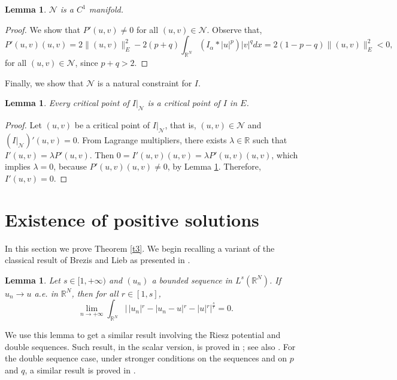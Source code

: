 \documentclass[12pt,a4paper]{article}
\newtheorem{lemma}[theorem]{Lemma}
\numberwithin{equation}{section}
\begin{document}
\begin{lemma}\label{l9}
$\mathcal{N}$ is a $C^1$ manifold.
\end{lemma}
\begin{proof}
We show that $P'(u, v)\neq 0$ for all $(u, v)\in \mathcal{N}$. Observe that,
$$
P'(u,v)(u, v)= 2\|(u, v)\|_{E}^{2}-2(p+q)\int_{\mathbb{R}^N} (I_\alpha \ast |u|^p)|v|^q dx = 2(1-p-q)\|(u, v)\|_{E}^{2} <0, 
$$
for all $(u, v)\in \mathcal{N}$, since $p+q>2$.
\end{proof}

Finally, we show that $\mathcal{N}$ is a natural constraint for $I$.

\begin{lemma}\label{l10}
Every critical point of $I\big\vert_{\mathcal{N}}$ is a critical point of $I$ in $E$.
\end{lemma}
\begin{proof}
Let $(u, v)$ be a critical point of $I\big\vert_{\mathcal{N}}$, that is, $(u, v)\in \mathcal{N}$ and $(I\big\vert_{\mathcal{N}})'(u, v)=0$. From Lagrange multipliers, there exists $\lambda\in \mathbb{R}$ such that
$
I'(u, v)= \lambda P'(u, v)
$. Then $0=I'(u, v)(u, v)=\lambda P'(u, v)(u, v)$, which implies $\lambda=0$, because $P'(u, v)(u, v)\neq 0$, by Lemma \ref{l9}. Therefore, $I'(u, v)=0$.
\end{proof}


\section{Existence of positive solutions}\label{sec-exist}

In this section we prove Theorem \ref{t3}. We begin recalling a variant of the classical result of Brezis and Lieb \cite{BrezisLieb1983} as presented in \cite[Lemma 2.5]{Moroz2013}.

\begin{lemma}\label{l13}
Let $s\in [1, +\infty)$ and $(u_{n})$ a bounded sequence in $L^{s}(\mathbb{R}^N)$. If $u_{n} \rightarrow u$ a.e. in $\mathbb{R}^N$, then for all $r \in [1, s]$, 
$$
\lim\limits_{n\rightarrow + \infty} \int_{\mathbb{R}^N} |\,|u_{n}|^r -|u_{n} - u|^r -|u|^r|^{\frac{s}{r}} = 0.
$$
\end{lemma}

We use this lemma to get a similar result involving the Riesz potential and double sequences. Such result, in the scalar version, is proved in \cite[Lemma 2.4]{Moroz2013}; see also \cite[p. 90]{Lions-Hartree}. For the double sequence case, under stronger conditions on the sequences and on $p$ and $q$, a similar result is proved in \cite[Lemma 2.4]{Chen2023a}.
\end{document}
